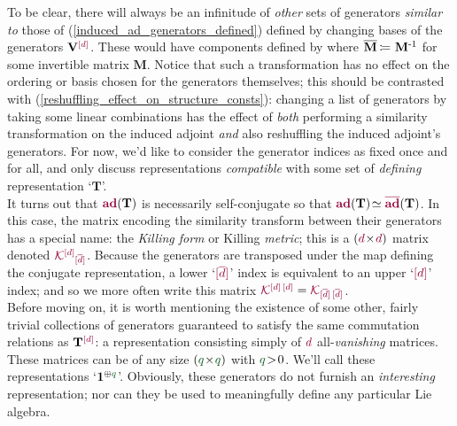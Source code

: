 \documentclass[12pt,a4paper]{article}\let\ifpdf\relax
\begin{document}
To be clear, there will always be an infinitude of \emph{other} sets of generators \emph{similar to} those of (\ref{induced_ad_generators_defined}) defined by changing bases of the generators $\mathbf{V}\indices{\r{[d]}}{}$. These would have components defined by 
%
%
where $\mathbf{\bar{M}}\equivR\mathbf{M}^{\text{-}1}$ for some invertible matrix $\mathbf{M}$. Notice that such a transformation has no effect on the ordering or basis chosen for the generators themselves; this should be contrasted with (\ref{reshuffling_effect_on_structure_consts}): changing a list of generators by taking some linear combinations has the effect of \emph{both} performing a similarity transformation on the induced adjoint \emph{and} also reshuffling the induced adjoint's generators. For now, we'd like to consider the generator indices as fixed once and for all, and only discuss representations \emph{compatible} with some set of \emph{defining} representation `$\mathbf{T}$'.\\[-10pt]


It turns out that $\mathbf{\r{ad}}(\mathbf{T})$ is necessarily self-conjugate so that $\mathbf{\r{ad}}(\mathbf{T})\!\simeq\mathbf{\r{\bar{ad}}}(\mathbf{T})$. In this case, the matrix encoding the similarity transform between their generators has a special name: the \emph{Killing form} or Killing \emph{metric}; this is a $(\r{d}\!\times\!\r{d})$ matrix denoted $\mathcal{\r{K}}\indices{\r{[{d}]}}{\r{[\bar{d}]}}$. Because the generators are transposed under the map defining the conjugate representation, a lower `$\r{[\bar{d}]}$' index is equivalent to an {upper} `$\r{[d]}$' index; and so we more often write this matrix $\mathcal{\r{K}}\indices{\r{[d]\,[d]}}{}=\mathcal{\r{K}}\indices{}{\r{[\bar{d}]\,[\bar{d}]}}$.\\[-10pt]

Before moving on, it is worth mentioning the existence of some other, fairly trivial collections of generators guaranteed to satisfy the same commutation relations as $\mathbf{T}\indices{\r{[d]}}{}$: a representation consisting simply of $\r{d}$ all-\emph{vanishing} matrices. These matrices can be of any size $(\g{q}\!\times\!\g{q})$ with $\g{q}\!>\!0$. We'll call these representations `$\mathbf{1}\indices{\oplus\g{q}}{}$'. Obviously, these generators do not furnish an \emph{interesting} representation; nor can they be used to meaningfully define any particular Lie algebra.
\end{document}
